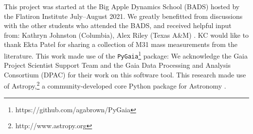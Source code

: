 \documentclass[twocolumn]{aastex631}
\begin{document}








\begin{acknowledgements}

This project was started at the Big Apple Dynamics School (BADS) hosted by the
Flatiron Institute July--August 2021.
We greatly benefitted from discussions with the other students who attended the
BADS, and received helpful input from:
Kathryn Johnston (Columbia), Alex Riley (Texas A\&M)
.
KC would like to thank Ekta Patel for sharing a collection of M31 mass measurements from the literature.
This work made use of the
\texttt{PyGaia}\footnote{https://github.com/agabrown/PyGaia} package: We
acknowledge the Gaia Project Scientist Support Team and the Gaia Data Processing
and Analysis Consortium (DPAC) for their work on this software tool.
This research made use of Astropy,\footnote{http://www.astropy.org} a
community-developed core Python package for Astronomy \citep{astropy:2013,
astropy:2018}.
\end{acknowledgements}

\end{document}
